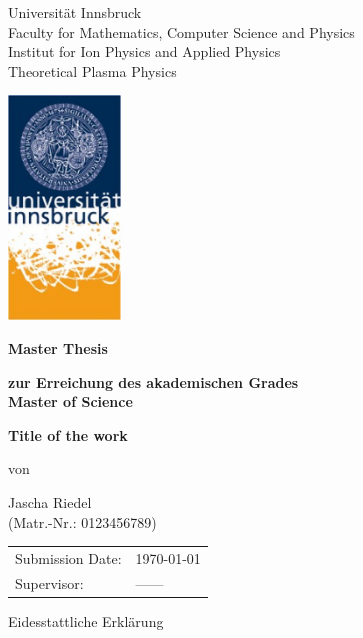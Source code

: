 \documentclass[12pt,oneside,bibtotoc,liststotoc]{scrbook}
\begin{document}
\thispagestyle{empty}
\begin{center}
\LARGE{Universität Innsbruck\\
Faculty for Mathematics, Computer Science and Physics}\\[3ex]
\large{Institut for Ion Physics and Applied Physics}\\[2ex]
\large{Theoretical Plasma Physics}
\end{center}
\medskip

\begin{center}
\includegraphics[width=3cm]{Logo}
\vspace{1.5cm}

\textbf{\LARGE{Master Thesis}}
\medskip\par
\textbf{\normalsize{zur Erreichung des akademischen Grades}} \\[3ex]
\textbf{\Large{Master of Science}}
\vspace{2cm}

\textbf{\Large{Title of the work}}
\bigskip\par
von \par
\large{Jascha Riedel}\\
(Matr.-Nr.: 0123456789)
\end{center}
\vspace{1cm}

\begin{tabular}{ll}
  Submission Date:  & \today \\
  Supervisor: & ------ \\
\end{tabular}

\newpage

\vspace*{5cm}

\begin{center}
\LARGE{Eidesstattliche Erklärung}\\
\end{center}
\vspace{1cm}
\end{document}
